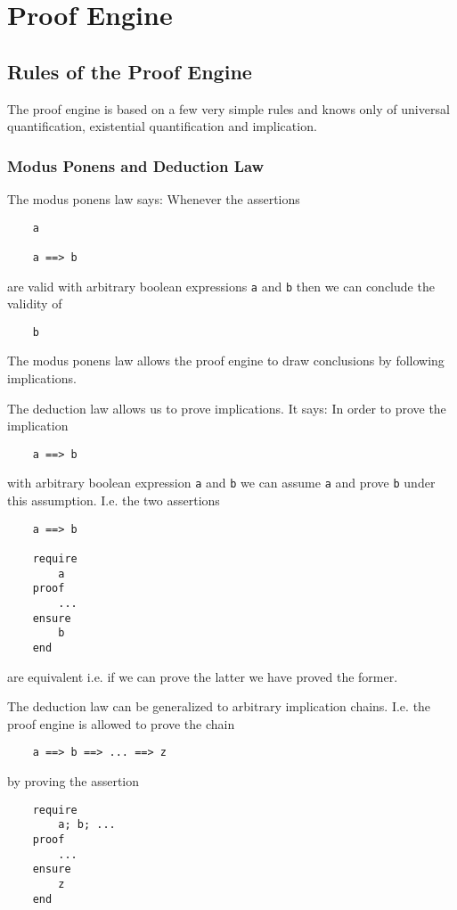 \chapter{Proof Engine}


\section{Rules of the Proof Engine}


The proof engine is based on a few very simple rules and knows only of
universal quantification, existential quantification and implication.

\subsection{Modus Ponens and Deduction Law}

The modus ponens law says: Whenever the assertions
\begin{lstlisting}
    a

    a ==> b
\end{lstlisting}
are valid with arbitrary boolean expressions \lstinline!a! and \lstinline!b!
then we can conclude the validity of
%
\begin{lstlisting}
    b
\end{lstlisting}

The modus ponens law allows the proof engine to draw conclusions by following
implications.

The deduction law allows us to prove implications. It says: In order to prove
the implication
\begin{lstlisting}
    a ==> b
\end{lstlisting}
with arbitrary boolean expression \lstinline!a! and \lstinline!b! we can
assume \lstinline!a! and prove \lstinline!b!  under this assumption. I.e. the
two assertions
\begin{lstlisting}
    a ==> b

    require
        a
    proof
        ...
    ensure
        b
    end
\end{lstlisting}
are equivalent i.e. if we can prove the latter we have proved the former.

The deduction law can be generalized to arbitrary implication chains. I.e. the
proof engine is allowed to prove the chain

\begin{lstlisting}
    a ==> b ==> ... ==> z
\end{lstlisting}
%
by proving the assertion
\begin{lstlisting}
    require
        a; b; ...
    proof
        ...
    ensure
        z
    end
\end{lstlisting}


